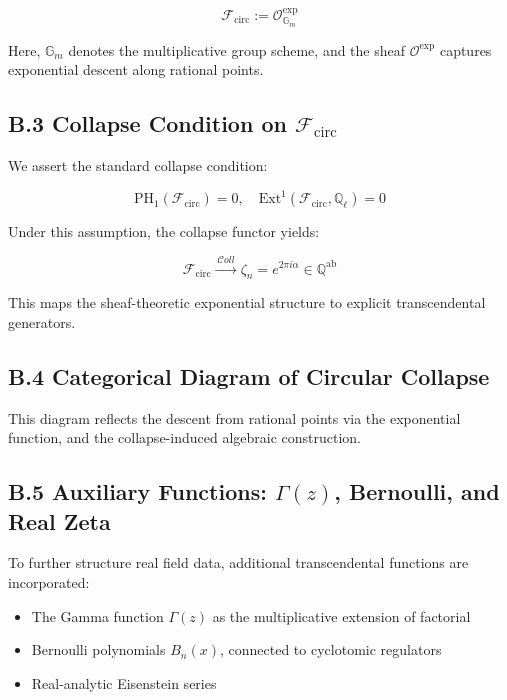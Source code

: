 \documentclass[11pt]{article}
\begin{document}
\[
\mathcal{F}_{\mathrm{circ}} := \mathcal{O}_{\mathbb{G}_m}^{\exp}
\]

Here, \( \mathbb{G}_m \) denotes the multiplicative group scheme, and the sheaf \( \mathcal{O}^{\exp} \) captures exponential descent along rational points.

\subsection*{B.3 Collapse Condition on \( \mathcal{F}_{\mathrm{circ}} \)}

We assert the standard collapse condition:

\[
\mathrm{PH}_1(\mathcal{F}_{\mathrm{circ}}) = 0, \quad \mathrm{Ext}^1(\mathcal{F}_{\mathrm{circ}}, \mathbb{Q}_\ell) = 0
\]

Under this assumption, the collapse functor yields:

\[
\mathcal{F}_{\mathrm{circ}} \xrightarrow{\ \mathcal{C}oll\ } \zeta_n = e^{2\pi i \alpha} \in \mathbb{Q}^{\mathrm{ab}}
\]

This maps the sheaf-theoretic exponential structure to explicit transcendental generators.

\subsection*{B.4 Categorical Diagram of Circular Collapse}

\begin{center}
\end{center}

This diagram reflects the descent from rational points via the exponential function, and the collapse-induced algebraic construction.

\subsection*{B.5 Auxiliary Functions: \( \Gamma(z) \), Bernoulli, and Real Zeta}

To further structure real field data, additional transcendental functions are incorporated:
\begin{itemize}
    \item The Gamma function \( \Gamma(z) \) as the multiplicative extension of factorial
    \item Bernoulli polynomials \( B_n(x) \), connected to cyclotomic regulators
    \item Real-analytic Eisenstein series
\end{itemize}
\end{document}
